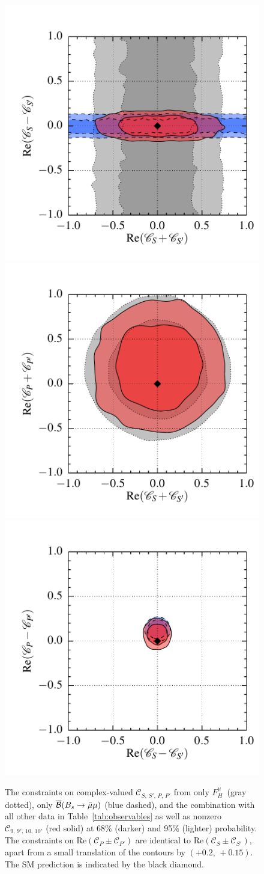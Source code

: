 \documentclass[twocolumn,epjc3]{svjour3}
\numberwithin{equation}{section}
\def \reftab#1{Table~\ref{#1}}
\newcommand{\wilson}[2][{}]{\mathcal{C}_{#2}^{\mathrm{#1}}}
\renewcommand{\[}{\big[}
\renewcommand{\]}{\big]}
\renewcommand{\(}{\big(}
\renewcommand{\)}{\big)}
\begin{document}
\begin{figure}
  \begin{center}
    \includegraphics[width=.325\textwidth]{plots/pdf/scSP_FH,scSP_Bsmumu,sc910SP_K_KstarBR_Bsmumu_0,2}
    \includegraphics[width=.325\textwidth]{plots/pdf/scSP_FH,sc910SP_K_KstarBR_Bsmumu_0,4}
    \includegraphics[width=.325\textwidth]{plots/pdf/scSP_Bsmumu,sc910SP_K_KstarBR_Bsmumu_2,6}
  \end{center}
  \caption{ The constraints on complex-valued
    $\wilson{S,\,S',\,P,\,P'}$ from only $F_H^\mu$~(gray dotted), only
    $\overline{\cal B}(B_s \to \bar\mu\mu)$ (blue dashed), and the
    combination with all other data in \reftab{tab:observables} as
    well as nonzero $\wilson[]{9,\,9',\,10,\, 10'}$ (red solid) at
    68\% (darker) and 95\% (lighter) probability. The constraints on
    Re$(\wilson{P} \pm \wilson{P'})$ are identical to Re$(\wilson{S}
    \pm \wilson{S'})$, apart from a small translation of the contours
    by $(+0.2,\, +0.15)$. The SM prediction is indicated by the black
    diamond. }
  \label{fig:scalar}
\end{figure}
\end{document}
